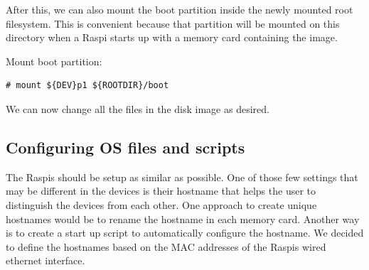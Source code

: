 After this, we can also mount the boot partition inside the newly mounted
root filesystem. This is convenient because that partition will be mounted
on this directory when a \ac{Raspi} starts up with a memory card containing
the image. %

Mount boot partition:
\begin{lstlisting}[]
# mount ${DEV}p1 ${ROOTDIR}/boot
\end{lstlisting}
\FloatBarrier
\vspace{-5mm}

We can now change all the files in the disk image as desired.



\subsection{Configuring OS files and scripts}

The \ac{Raspi}s should be setup as similar as possible. One of those
few settings that may be different in the devices is their hostname that
helps the user to distinguish the devices from each other.
One approach to create unique hostnames would be to rename the hostname
in each memory card. Another way is to create a start up script to automatically
configure the hostname. We decided to define the hostnames based on the \ac{MAC}
addresses of the \ac{Raspi}s wired ethernet interface.

%


